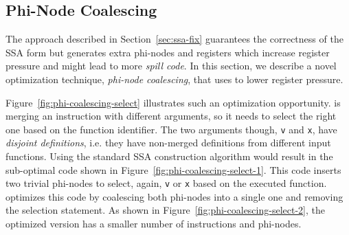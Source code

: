 


\subsection{Phi-Node Coalescing} \label{sec:pncoalescing}

The approach described in Section~\ref{sec:ssa-fix} guarantees the correctness of the SSA form but generates extra
phi-nodes and registers which increase register pressure and might lead to more \textit{spill code}. In this section, we describe a novel optimization technique, \textit{phi-node coalescing}, that {\ProjName} uses to lower register pressure.


Figure~\ref{fig:phi-coalescing-select} illustrates such an optimization opportunity. {\ProjName} is merging an instruction with different arguments,
so it needs to select the right one based on the function identifier. The two arguments though, \texttt{v} and \texttt{x}, have \textit{disjoint definitions},
i.e. they have non-merged definitions from different input functions. Using the standard SSA construction algorithm would result in
the sub-optimal code shown in Figure~\ref{fig:phi-coalescing-select-1}. This code inserts two trivial phi-nodes to select, again, \texttt{v} or \texttt{x}
based on the executed function. {\ProjName} optimizes this code by coalescing both phi-nodes into a single one and removing the
selection statement. As shown in Figure~\ref{fig:phi-coalescing-select-2}, the optimized version has a smaller number of instructions and
phi-nodes.



